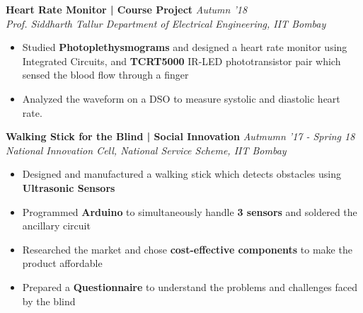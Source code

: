 \documentclass[11pt]{article}%
\begin{document}
{\flushleft \bf \large{Heart Rate Monitor | Course Project}} \hfill  \hfill {{\em{Autumn '18} }}\\
{\em{Prof. Siddharth Tallur \textbar Department of Electrical Engineering, IIT Bombay}}
\begin{itemize}
\vspace{-2mm}
\setlength\itemsep{0.01em}
\item Studied {\bf Photoplethysmograms} and designed a heart rate monitor using Integrated Circuits, and {\bf TCRT5000} IR-LED phototransistor pair which sensed the blood flow through a finger
\vspace{-1.2mm}
\item Analyzed the waveform on a DSO to measure systolic and diastolic heart rate.
\vspace{-1.2mm}
\end{itemize}
\vspace{-0.4cm}


{\flushleft \bf \large{Walking Stick for the Blind | Social Innovation}} \hfill {{{\em{Autmumn '17 - Spring 18}}}} \\
{\em{National Innovation Cell, National Service Scheme, IIT Bombay}}
\vspace{-2mm}
\begin{itemize}
\setlength\itemsep{0.01em}
\item Designed and manufactured a walking stick which detects obstacles using {\bf Ultrasonic Sensors}
\vspace{-1.2mm}
\item Programmed {\bf Arduino} to simultaneously handle {\bf 3 sensors} and soldered the ancillary circuit
\vspace{-1.2mm}
\item Researched the market and chose {\bf cost-effective components} to make the product affordable
\vspace{-1.2mm}
\item Prepared a {\bf Questionnaire} to understand the problems and challenges faced by the blind
\end{itemize}
\vspace{-0.5cm}
\end{document}
